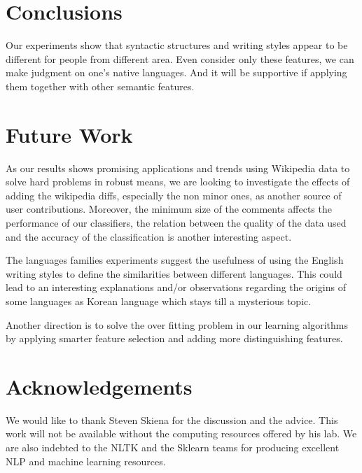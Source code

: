 \documentclass[11pt]{article}
\begin{document}
\section{Conclusions}
Our experiments show that syntactic structures and writing styles appear to be different for people from different area. Even consider only these features, we can make judgment on one's native languages. And it will be supportive if applying them together with other semantic features.      

\section{Future Work}
As our results shows promising applications and trends using Wikipedia data to solve hard problems in robust means, we are looking to investigate the effects of adding the wikipedia diffs, especially the non minor ones, as another source of user contributions. Moreover, the minimum size of the comments affects the performance of our classifiers, the relation between the quality of the data used and the accuracy of the classification is another interesting aspect.

The languages families experiments suggest the usefulness of using the English writing styles to define the similarities between different languages. This could lead to an interesting explanations and/or observations regarding the origins of some languages as Korean language which stays till a mysterious topic.

Another direction is to solve the over fitting problem in our learning algorithms by applying smarter feature selection and adding more distinguishing features.



\section*{Acknowledgements}
We would like to thank Steven Skiena for the discussion and the advice. This work will not be available without the computing resources offered by his lab. We are also indebted to the NLTK and the Sklearn teams for producing excellent NLP and machine learning resources.
\end{document}
